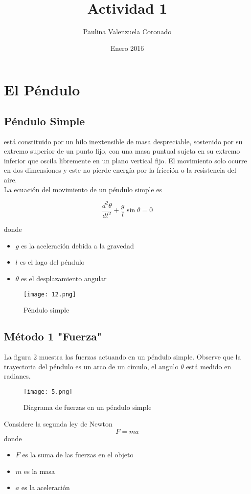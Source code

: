 \documentclass[12pt]{article}
\title{Actividad 1}
\author{Paulina Valenzuela Coronado}
\date{Enero 2016}
\begin{document}
\maketitle

\section{El Péndulo}
\subsection{Péndulo Simple}
está constituido por un hilo inextensible de masa despreciable, sostenido por su extremo superior de un punto fijo, con una masa puntual sujeta en su extremo inferior que oscila libremente en un plano vertical fijo.
El movimiento solo ocurre en dos dimensiones y este no pierde energía por la fricción o la resistencia del aire.\cite{Wiki} \\

La ecuación del movimiento de un péndulo simple es 

\begin{equation}
\frac{
d^2\theta}{dt^2}+\frac{g}{l}\sin\theta=0
\end{equation}

donde
\begin{itemize}
\item $g$ es la aceleración debida a la gravedad
\item $l$ es el lago del péndulo
\item $\theta$ es el desplazamiento angular 
\end{itemize}

\begin{figure}[H]
	\centering
\texttt{[image: 12.png]}
 \caption{Péndulo simple}
\end{figure} 

\subsection{Método 1 "Fuerza"}		
La figura 2 muestra las fuerzas actuando en un péndulo simple. Observe que la trayectoria del péndulo es un arco de un círculo, el angulo $\theta$ está medido en radianes.	

\begin{figure}[H]
   \centering
	\texttt{[image: 5.png]}
	\caption{Diagrama de fuerzas en un péndulo simple}
\end{figure}
        
Considere la segunda ley de Newton
$$F=ma$$
donde 
\begin{itemize}
	\item $F$ es la suma de las fuerzas en el objeto
	\item $m$ es la masa
	\item $a$ es la aceleración
\end{itemize}
\end{document}
